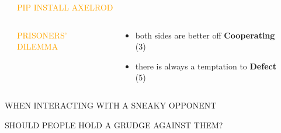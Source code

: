 \documentclass[usenames,dvipsnames,t]{beamer}
\begin{document}
\begin{frame}[fragile]

\begin{columns}
  \begin{column}{.03\linewidth}
  \end{column}
  \begin{column}{.45\linewidth}
   \vspace{1cm}

    \centering
    {\fontsize{120}{130}\selectfont\textcolor{orange}{PIP \hspace{2.5cm} INSTALL \hspace{2cm} AXELROD}}

  \begin{columns}
  \begin{column}{.40\linewidth}

   \vspace{1cm}

    \centering
    \textcolor{orange}{\LARGE{PRISONERS' DILEMMA}}
  \end{column}
  \begin{column}{.55\linewidth}
    \large{
    \begin{itemize}
      \item both sides are better off \textbf{Cooperating} (3)
      \item there is always a temptation to \textbf{Defect} (5)
    \end{itemize}
    }
    \end{column}
    \end{columns}
  \end{column}
  \begin{column}{.30\linewidth}

 \hspace{9cm}  
  \end{column}
  \end{columns}
  \begin{columns}
    \begin{column}{.25\linewidth}
   \vspace{1cm}

\begin{center}
\Large{\textcolor{red!80}{WHEN INTERACTING WITH A SNEAKY OPPONENT}}
\end{center}
\begin{center}
\Large{\textcolor{red!80}{SHOULD PEOPLE HOLD A GRUDGE AGAINST THEM?}}
\end{center}


\end{column}
\end{columns}
\end{frame}
\end{document}
